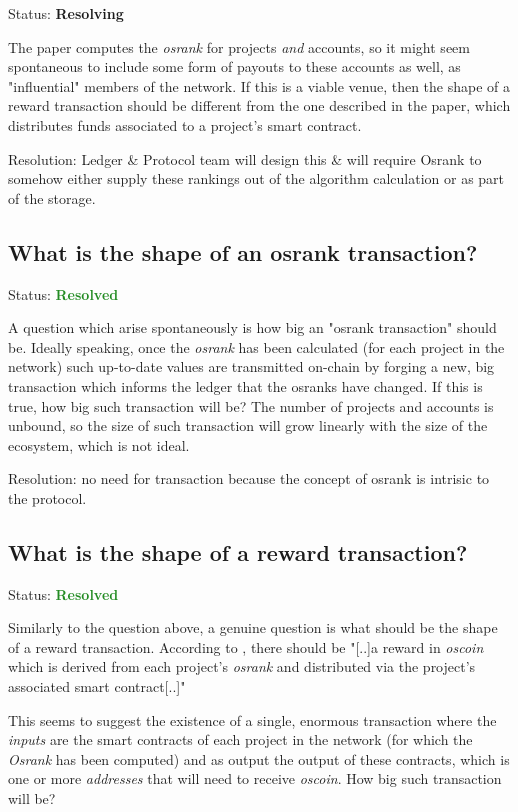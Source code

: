 \documentclass{article}
\begin{document}
Status: \textcolor{YellowOrange}{\textbf{Resolving}}

The paper computes the \textit{osrank} for projects \textit{and} accounts,
so it might seem spontaneous to include some form of payouts to these accounts
as well, as "influential" members of the network. If this is a viable venue,
then the shape of a reward transaction should be different from the one
described in the paper, which distributes funds associated to a project's
smart contract.

Resolution: Ledger \& Protocol team will design this
\& will require Osrank to somehow either supply these
rankings out of the algorithm calculation or as
part of the storage.

\subsection{What is the shape of an osrank transaction?}

Status: \textcolor{ForestGreen}{\textbf{Resolved}}

A question which arise spontaneously is how big an "osrank transaction" should
be. Ideally speaking, once the \textit{osrank} has been calculated (for each
project in the network) such up-to-date values are transmitted on-chain by
forging a new, big transaction which informs the ledger that the osranks
have changed. If this is true, how big such transaction will be? The number
of projects and accounts is unbound, so the size of such transaction will
grow linearly with the size of the ecosystem, which is not ideal.

Resolution: no need for transaction because the
concept of osrank is intrisic to the protocol.

\subsection{What is the shape of a reward transaction?}

Status: \textcolor{ForestGreen}{\textbf{Resolved}}

Similarly to the question above, a genuine question is what should be the
shape of a reward transaction. According to \citep{opensourcecoin2019}, there
should be "[..]a reward in \textit{oscoin} which is derived from each project's
\textit{osrank} and distributed via the project's associated smart
contract[..]"

This seems to suggest the existence of a single, enormous transaction where
the \textit{inputs} are the smart contracts of each project in the network
(for which the \textit{Osrank} has been computed) and as output the output of these
contracts, which is one or more \textit{addresses} that will need to receive
\textit{oscoin}. How big such transaction will be?
\end{document}

